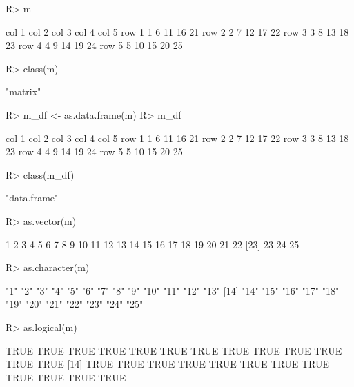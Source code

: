 \documentclass[fleqn, letter, 10pt]{article}
\begin{document}
\begin{Schunk}
\begin{Sinput}
R> m
\end{Sinput}
\begin{Soutput}
      col 1 col 2 col 3 col 4 col 5
row 1     1     6    11    16    21
row 2     2     7    12    17    22
row 3     3     8    13    18    23
row 4     4     9    14    19    24
row 5     5    10    15    20    25
\end{Soutput}
\begin{Sinput}
R> class(m)
\end{Sinput}
\begin{Soutput}
[1] "matrix"
\end{Soutput}
\begin{Sinput}
R> m_df <- as.data.frame(m)
R> m_df
\end{Sinput}
\begin{Soutput}
      col 1 col 2 col 3 col 4 col 5
row 1     1     6    11    16    21
row 2     2     7    12    17    22
row 3     3     8    13    18    23
row 4     4     9    14    19    24
row 5     5    10    15    20    25
\end{Soutput}
\begin{Sinput}
R> class(m_df)
\end{Sinput}
\begin{Soutput}
[1] "data.frame"
\end{Soutput}
\begin{Sinput}
R> as.vector(m)
\end{Sinput}
\begin{Soutput}
 [1]  1  2  3  4  5  6  7  8  9 10 11 12 13 14 15 16 17 18 19 20 21 22
[23] 23 24 25
\end{Soutput}
\begin{Sinput}
R> as.character(m)
\end{Sinput}
\begin{Soutput}
 [1] "1"  "2"  "3"  "4"  "5"  "6"  "7"  "8"  "9"  "10" "11" "12" "13"
[14] "14" "15" "16" "17" "18" "19" "20" "21" "22" "23" "24" "25"
\end{Soutput}
\begin{Sinput}
R> as.logical(m)
\end{Sinput}
\begin{Soutput}
 [1] TRUE TRUE TRUE TRUE TRUE TRUE TRUE TRUE TRUE TRUE TRUE TRUE TRUE
[14] TRUE TRUE TRUE TRUE TRUE TRUE TRUE TRUE TRUE TRUE TRUE TRUE
\end{Soutput}
\end{Schunk}
\end{document}
